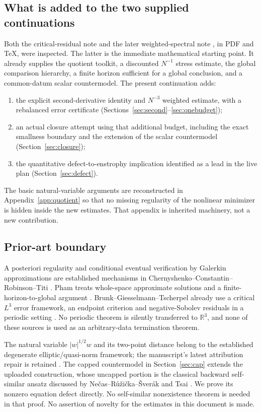 \documentclass[11pt,a4paper]{article}
\theoremstyle{definition}\newtheorem{definition}[theorem]{Definition}
\theoremstyle{remark}\newtheorem{remark}[theorem]{Remark}
\newcommand{\R}{\mathbb R}
\numberwithin{equation}{section}
\begin{document}
\subsection{What is added to the two supplied continuations}
Both the critical-residual note \cite{CriticalUpload} and the later weighted-spectral note \cite{WeightedUpload}, in PDF and TeX, were inspected. The latter is the immediate mathematical starting point. It already supplies the quotient toolkit, a discounted $N^{-1}$ stress estimate, the global comparison hierarchy, a finite horizon sufficient for a global conclusion, and a common-datum scalar countermodel. The present continuation adds:

\begin{enumerate}
\item the explicit second-derivative identity and $N^{-3}$ weighted estimate, with a rebalanced error certificate (Sections~\ref{sec:second}--\ref{sec:onebudget});
\item an actual closure attempt using that additional budget, including the exact smallness boundary and the extension of the scalar countermodel (Section~\ref{sec:closure});
\item the quantitative defect-to-enstrophy implication identified as a lead in the live plan (Section~\ref{sec:defect}).
\end{enumerate}
The basic natural-variable arguments are reconstructed in Appendix~\ref{app:quotient} so that no missing regularity of the nonlinear minimizer is hidden inside the new estimates. That appendix is inherited machinery, not a new contribution.

\subsection{Prior-art boundary}
A posteriori regularity and conditional eventual verification by Galerkin approximations are established mechanisms in Chernyshenko--Constantin--Robinson--Titi \cite{CCRT}. Pham treats whole-space approximate solutions and a finite-horizon-to-global argument \cite{Pham}. Brunk--Giesselmann--Tscherpel already use a critical $L^3$ error framework, an endpoint criterion and negative-Sobolev residuals in a periodic setting \cite{BGT}. No periodic theorem is silently transferred to $\R^3$, and none of these sources is used as an arbitrary-data termination theorem.

The natural variable $|w|^{1/2}w$ and its two-point distance belong to the established degenerate elliptic/quasi-norm framework; the manuscript's latest attribution repair is retained \cite{Paper}. The capped countermodel in Section~\ref{sec:cap} extends the uploaded construction, whose uncapped portion is the classical backward self-similar ansatz discussed by Ne\v cas--R\r u\v zi\v cka--\v Sver\'ak and Tsai \cite{NRS,Tsai}. We prove its nonzero equation defect directly. No self-similar nonexistence theorem is needed in that proof. No assertion of novelty for the estimates in this document is made.
\end{document}
